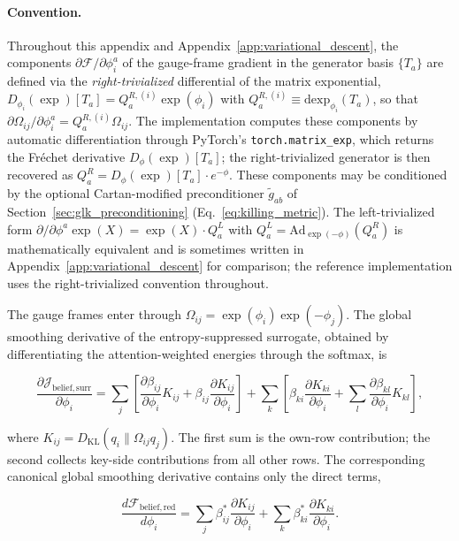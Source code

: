 \documentclass[twoside,11pt]{article}
\begin{document}
\paragraph{Convention.} Throughout this appendix and Appendix~\ref{app:variational_descent}, the components $\partial \mathcal{F}/\partial \phi_i^a$ of the gauge-frame gradient in the generator basis $\{T_a\}$ are defined via the \emph{right-trivialized} differential of the matrix exponential, $D_{\phi_i}(\exp)[T_a] = Q_a^{R,(i)} \exp(\phi_i)$ with $Q_a^{R,(i)} \equiv \mathrm{dexp}_{\phi_i}(T_a)$, so that $\partial \Omega_{ij}/\partial \phi_i^a = Q_a^{R,(i)} \Omega_{ij}$. The implementation computes these components by automatic differentiation through PyTorch's \texttt{torch.matrix\_exp}, which returns the Fr\'echet derivative $D_\phi(\exp)[T_a]$; the right-trivialized generator is then recovered as $Q_a^R = D_\phi(\exp)[T_a]\cdot e^{-\phi}$. These components may be conditioned by the optional Cartan-modified preconditioner $\tilde g_{ab}$ of Section~\ref{sec:glk_preconditioning} (Eq.~\ref{eq:killing_metric}). The left-trivialized form $\partial/\partial\phi^a \exp(X) = \exp(X)\cdot Q_a^L$ with $Q_a^L = \mathrm{Ad}_{\exp(-\phi)}(Q_a^R)$ is mathematically equivalent and is sometimes written in Appendix~\ref{app:variational_descent} for comparison; the reference implementation uses the right-trivialized convention throughout.

The gauge frames enter through $\Omega_{ij}=\exp(\phi_i)\exp(-\phi_j)$. The global smoothing derivative of the entropy-suppressed surrogate, obtained by differentiating the attention-weighted energies through the softmax, is

\begin{equation}
\frac{\partial \mathcal{J}_{\mathrm{belief,surr}}}{\partial \phi_i}
= \sum_j \left[
\frac{\partial \beta_{ij}}{\partial \phi_i} K_{ij}
+ \beta_{ij} \frac{\partial K_{ij}}{\partial \phi_i}
\right]
+ \sum_k \left[
\beta_{ki} \frac{\partial K_{ki}}{\partial \phi_i}
+ \sum_l \frac{\partial \beta_{kl}}{\partial \phi_i} K_{kl}
\right],
\label{eq:phi_grad_complete}
\end{equation}

where $K_{ij}=D_{\mathrm{KL}}(q_i\|\Omega_{ij}q_j)$. The first sum is the own-row contribution; the second collects key-side contributions from all other rows. The corresponding canonical global smoothing derivative contains only the direct terms,

\begin{equation}
\frac{d\mathcal{F}_{\mathrm{belief,red}}}{d\phi_i}
=\sum_j\beta_{ij}^*\frac{\partial K_{ij}}{\partial\phi_i}
+\sum_k\beta_{ki}^*\frac{\partial K_{ki}}{\partial\phi_i}.
\label{eq:phi_grad_canonical}
\end{equation}
\end{document}
